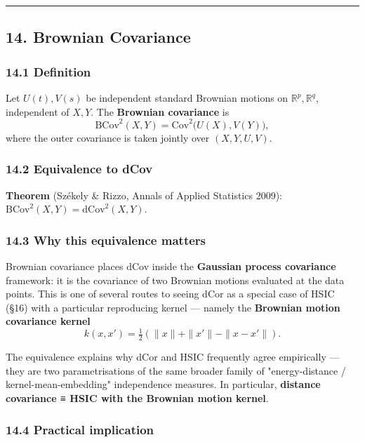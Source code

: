 \documentclass{article}
\begin{document}
\begin{center}\rule{0.5\linewidth}{0.5pt}\end{center}

\subsection{14. Brownian Covariance}\label{14-brownian-covariance}

\subsubsection{14.1 Definition}\label{141-definition}

Let \(U(t), V(s)\) be independent standard Brownian motions on
\(\mathbb{R}^p, \mathbb{R}^q\), independent of \(X, Y\). The
\textbf{Brownian covariance} is \[
\mathrm{BCov}^2(X, Y) = \mathrm{Cov}^2\big(U(X), V(Y)\big),
\] where the outer covariance is taken jointly over \((X, Y, U, V)\).

\subsubsection{14.2 Equivalence to dCov}\label{142-equivalence-to-dcov}

\textbf{Theorem} (Székely \& Rizzo, Annals of Applied Statistics 2009):
\(\mathrm{BCov}^2(X, Y) = \mathrm{dCov}^2(X, Y)\).

\subsubsection{14.3 Why this equivalence
matters}\label{143-why-this-equivalence-matters}

Brownian covariance places dCov inside the \textbf{Gaussian process
covariance} framework: it is the covariance of two Brownian motions
evaluated at the data points. This is one of several routes to seeing
dCor as a special case of HSIC (§16) with a particular reproducing
kernel --- namely the \textbf{Brownian motion covariance kernel} \[
k(x, x') = \tfrac{1}{2}(\|x\| + \|x'\| - \|x - x'\|).
\]

The equivalence explains why dCor and HSIC frequently agree empirically
--- they are two parametrisations of the same broader family of
"energy-distance / kernel-mean-embedding" independence measures. In
particular, \textbf{distance covariance ≡ HSIC with the Brownian motion
kernel}.

\subsubsection{14.4 Practical
implication}\label{144-practical-implication}
\end{document}
